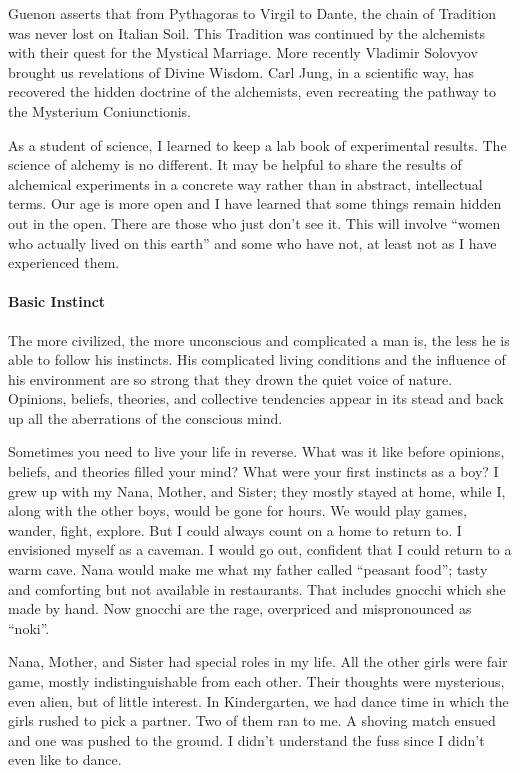 Guenon asserts that from Pythagoras to Virgil to Dante, the chain of Tradition was never lost on Italian Soil. This Tradition was continued by the alchemists with their quest for the Mystical Marriage. More recently Vladimir Solovyov brought us revelations of Divine Wisdom. Carl Jung, in a scientific way, has recovered the hidden doctrine of the alchemists, even recreating the pathway to the Mysterium Coniunctionis.

As a student of science, I learned to keep a lab book of experimental results. The science of alchemy is no different. It may be helpful to share the results of alchemical experiments in a concrete way rather than in abstract, intellectual terms. Our age is more open and I have learned that some things remain hidden out in the open. There are those who just don't see it. This will involve “women who actually lived on this earth” and some who have not, at least not as I have experienced them.

\paragraph{Basic Instinct}
\begin{quotex}
The more civilized, the more unconscious and complicated a man is, the less he is able to follow his instincts. His complicated living conditions and the influence of his environment are so strong that they drown the quiet voice of nature. Opinions, beliefs, theories, and collective tendencies appear in its stead and back up all the aberrations of the conscious mind. 

\end{quotex}
Sometimes you need to live your life in reverse. What was it like before opinions, beliefs, and theories filled your mind? What were your first instincts as a boy? I grew up with my Nana, Mother, and Sister; they mostly stayed at home, while I, along with the other boys, would be gone for hours. We would play games, wander, fight, explore. But I could always count on a home to return to. I envisioned myself as a caveman. I would go out, confident that I could return to a warm cave. Nana would make me what my father called “peasant food”; tasty and comforting but not available in restaurants. That includes gnocchi which she made by hand. Now gnocchi are the rage, overpriced and mispronounced as “noki”.

Nana, Mother, and Sister had special roles in my life. All the other girls were fair game, mostly indistinguishable from each other. Their thoughts were mysterious, even alien, but of little interest. In Kindergarten, we had dance time in which the girls rushed to pick a partner. Two of them ran to me. A shoving match ensued and one was pushed to the ground. I didn't understand the fuss since I didn't even like to dance.

